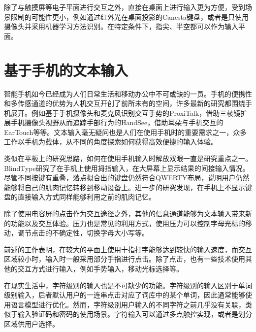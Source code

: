 除了与触摸屏等电子平面进行交互之外，直接在桌面上进行输入更为方便，受到场景限制的可能性更小，例如通过红外光在桌面投影的Canesta键盘\cite{roeber2003typing}，或者是只使用摄像头并采用机器学习方法识别\cite{murase2012gesture}。在特定条件下，指尖\cite{2019tiptext}、半空\cite{2015atk}都可以作为输入平面。

\section{基于手机的文本输入} %
智能手机如今已经成为人们日常生活和移动办公中不可或缺的一员。手机的便携性和多传感通道的优势为人机交互开创了前所未有的空间，许多最新的研究都围绕手机展开。例如基于手机摄像头和麦克风识别交互手势的ProxiTalk\cite{yang2019proxitalk}，借助三棱镜扩展手机摄像头视野从而追踪手部行为的HandSee\cite{yu2019handsee}，借助耳朵与手机交互的EarTouch\cite{wang2019eartouch}等等。文本输入毫无疑问也是人们在使用手机时的重要需求之一，众多工作以手机为载体，从不同的角度探索如何获得高效便捷的输入体验。

类似在平板上的研究思路，如何在使用手机输入时解放双眼一直是研究重点之一。BlindType\cite{2017blindtype}研究了在手机上使用拇指输入，在大屏幕上显示结果的间接输入情况。尽管不同按键有重叠，落点拟合出的键盘仍然符合QWERTY布局，说明用户仍然能够将自己的肌肉记忆转移到移动设备上。进一步的研究发现，在手机上不显示键盘的直接输入方式同样能够利用之前的肌肉记忆\cite{zhu2018typing}。

除了使用电容屏的点击作为交互途径之外，其他的信息通道能够为文本输入带来新的功能以及交互体验。压力也是常见的利用方式，使用压力可以控制字母光标的移动\cite{2018forceboard}，调节点击的不确定性\cite{weir2014uncertain}，切换字母大小写\cite{brewster2009pressure}等。



前述的工作表明，在较大的平面上使用十指打字能够达到较快的输入速度\cite{2018shitoast}，而交互区域较小时，输入时一般采用部分手指进行点击\cite{2017blindtype}\cite{zhu2018typing}。除了点击，也有一些技术使用其他的交互方式进行输入，例如手势输入\cite{murase2012gesture}\cite{zhu2019sfree}，移动光标选择\cite{2018forceboard}等。

在现实生活中，字符级别的输入也是不可缺少的功能。字符级别的输入区别于单词级别输入，后者默认用户的一连串点击对应了词库中的某个单词，因此通常能够使用语言模型进行优化。然而，字符级别用户输入的不同字符之前几乎没有关联，类似于输入验证码和密码的使用场景。字符输入可以通过多点触控实现\cite{bonner2010no}，或者是划分区域供用户选择\cite{banovic2013escape}。

